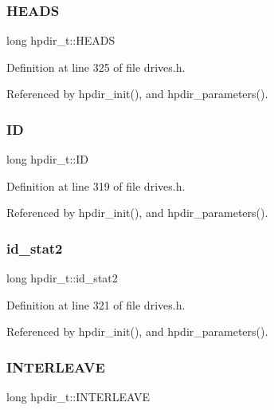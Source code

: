 \subsubsection{\texorpdfstring{H\+E\+A\+DS}{HEADS}}
{\footnotesize\ttfamily long hpdir\+\_\+t\+::\+H\+E\+A\+DS}



Definition at line 325 of file drives.\+h.



Referenced by hpdir\+\_\+init(), and hpdir\+\_\+parameters().

\mbox{\label{structhpdir__t_aae1a879f64c0ee2dc353d3581e8deec9}} 
\subsubsection{\texorpdfstring{ID}{ID}}
{\footnotesize\ttfamily long hpdir\+\_\+t\+::\+ID}



Definition at line 319 of file drives.\+h.



Referenced by hpdir\+\_\+init(), and hpdir\+\_\+parameters().

\mbox{\label{structhpdir__t_a1e3ef48d576fa036c6147ec0c5ec3aed}} 
\subsubsection{\texorpdfstring{id\+\_\+stat2}{id\_stat2}}
{\footnotesize\ttfamily long hpdir\+\_\+t\+::id\+\_\+stat2}



Definition at line 321 of file drives.\+h.



Referenced by hpdir\+\_\+init(), and hpdir\+\_\+parameters().

\mbox{\label{structhpdir__t_ade75ac3fc0b7d605383ca3203ba140bf}} 
\subsubsection{\texorpdfstring{I\+N\+T\+E\+R\+L\+E\+A\+VE}{INTERLEAVE}}
{\footnotesize\ttfamily long hpdir\+\_\+t\+::\+I\+N\+T\+E\+R\+L\+E\+A\+VE}



